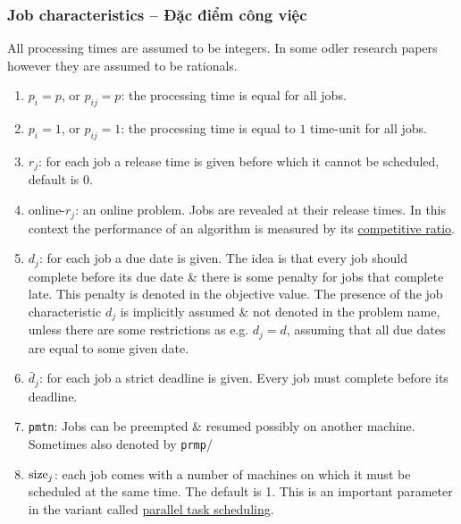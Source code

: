 \documentclass{article}
\begin{document}
\subsubsection{Job characteristics -- Đặc điểm công việc}
All processing times are assumed to be integers. In some odler research papers however they are assumed to be rationals.
\begin{enumerate}
	\item $p_i = p$, or $p_{ij} = p$: the processing time is equal for all jobs.
	\item $p_i = 1$, or $p_{ij} = 1$: the processing time is equal to $1$ time-unit for all jobs.
	\item $r_j$: for each job a release time is given before which it cannot be scheduled, default is 0.
	\item online-$r_j$: an online problem. Jobs are revealed at their release times. In this context the performance of an algorithm is measured by its \href{https://en.wikipedia.org/wiki/Competitive_analysis_(online_algorithm)}{competitive ratio}.
	\item $d_j$: for each job a due date is given. The idea is that every job should complete before its due date \& there is some penalty for jobs that complete late. This penalty is denoted in the objective value. The presence of the job characteristic $d_j$ is implicitly assumed \& not denoted in the problem name, unless there are some restrictions as e.g. $d_j = d$, assuming that all due dates are equal to some given date.
	\item $\bar{d}_j$: for each job a strict deadline is given. Every job must complete before its deadline.
	\item {\tt pmtn}: Jobs can be preempted \& resumed possibly on another machine. Sometimes also denoted by {\tt prmp}/
	\item ${\rm size}_j$: each job comes with a number of machines on which it must be scheduled at the same time. The default is 1. This is an important parameter in the variant called \href{https://en.wikipedia.org/wiki/Parallel_task_scheduling}{parallel task scheduling}.
\end{enumerate}
\end{document}
